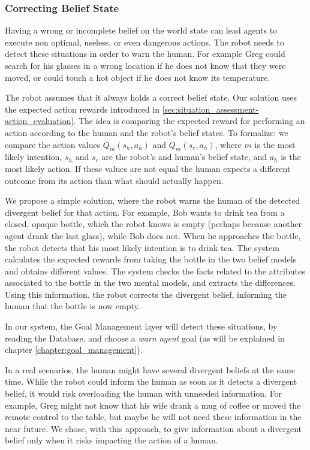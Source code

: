 \subsubsection{Correcting Belief State}
Having a wrong or incomplete belief on the world state can lead agents to execute non optimal, useless, or even dangerous actions. The robot needs to detect these situations in order to warn the human. For example Greg could search for his glasses in a wrong location if he does not know that they were moved, or could touch a hot object if he does not know its temperature.

 The robot assumes that it always holds a correct belief state. Our solution uses the expected action rewards introduced in \ref{sec:situation_assessment-action_evaluation}. The idea is comparing the expected reward for performing an action according to the human and the robot's belief states. To formalize: we compare the action values \(Q_m(s_h,a_h)\) and \(Q_m(s_r,a_h)\), where $m$ is the most likely intention,  $s_h$ and $s_r$ are the robot's and human's belief state, and $a_h$ is the most likely action. If these values are not equal the human expects a different outcome from its action than what should actually happen. 

We propose a simple solution, where the robot warns the human of the detected divergent belief for that action. For example, Bob wants to drink tea from a closed, opaque bottle, which the robot knows is empty (perhaps because another agent drank the last glass), while Bob does not. When he approaches the bottle, the robot detects that his most likely intention is to drink tea. The system calculates the expected rewards from taking the bottle in the two belief models and obtains different values. The system checks the facts related to the attributes associated to the bottle in the two mental models, and extracts the differences. Using this information, the robot corrects the divergent belief, informing the human that the bottle is now empty. 

In our system, the Goal Management layer will detect these situations, by reading the Database, and choose a \textit{warn agent} goal (as will be explained in chapter \ref{chapter:goal_management}).

In a real scenarios, the human might have several divergent beliefs at the same time. While the robot could inform the human as soon as it detects a divergent belief, it would risk overloading the human with unneeded information. For example, Greg might not know that his wife drank a mug of coffee or moved the remote control to the table, but maybe he will not need these information in the near future. We chose, with this approach, to give information about a divergent belief only when it risks impacting the action of a human.

